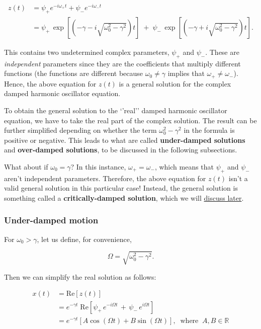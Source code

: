 \documentclass[11pt]{article}
\begin{document}
\[\begin{aligned}z(t) &= \psi_+ e^{-i\omega_+ t} + \psi_- e^{-i\omega_- t} \\ &= \psi_+ \, \exp\left[\left(-\gamma  - i \sqrt{\omega_0^2 - \gamma^2}\right)t\right] \; +\; \psi_- \, \exp\left[\left(-\gamma +i\sqrt{\omega_0^2 - \gamma^2}\right)t\right].\end{aligned}\]

This contains two undetermined complex parameters, \(\psi_+\) and
\(\psi_-\). These are \emph{independent} parameters since they are the
coefficients that multiply different functions (the functions are
different because \(\omega_0 \ne \gamma\) implies that
\(\omega_+ \ne \omega_-\)). Hence, the above equation for \(z(t)\) is a
general solution for the complex damped harmonic oscillator equation.

To obtain the general solution to the `'real'' damped harmonic
oscillator equation, we have to take the real part of the complex
solution. The result can be further simplified depending on whether the
term \(\omega_0^2 - \gamma^2\) in the formula is positive or negative.
This leads to what are called \textbf{under-damped solutions} and
\textbf{over-damped solutions}, to be discussed in the following
subsections.

What about if \(\omega_0 = \gamma\)? In this instance,
\(\omega_+ = \omega_-\), which means that \(\psi_+\) and \(\psi_-\)
aren't independent parameters. Therefore, the above equation for
\(z(t)\) isn't a valid general solution in this particular case!
Instead, the general solution is something called a
\textbf{critically-damped solution}, which we will
\protect\hyperlink{critical_damping}{discuss later}.

    \subsubsection{Under-damped motion}\label{under-damped-motion}

For \(\omega_0 > \gamma\), let us define, for convenience,

\[\Omega = \sqrt{\omega_0^2 - \gamma^2}.\]

Then we can simplify the real solution as follows:

\[\begin{align}x(t) &= \mathrm{Re}\left[z(t)\right] \\ &= e^{-\gamma t} \; \mathrm{Re}\left[\psi_+ \, e^{-i \Omega t} \,+\, \psi_- \, e^{i\Omega t}\right] \\ &= e^{-\gamma t} \left[ A\cos\left(\Omega t\right) + B \sin\left(\Omega t\right)\right], \;\;\mathrm{where}\;\; A, B \in \mathbb{R}\end{align}\]
\end{document}
